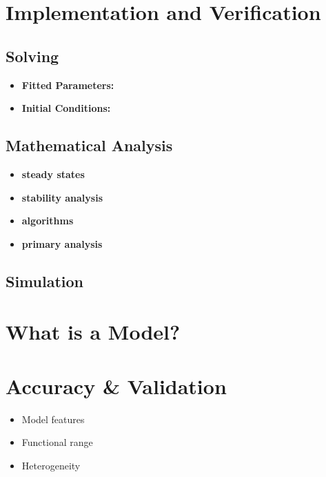 \documentclass[
]{book}
\begin{document}
\section{Implementation and Verification}\label{implementation-and-verification}

\subsection{Solving}\label{solving}

\begin{itemize}
\item
  \textbf{Fitted Parameters:}
\item
  \textbf{Initial Conditions:}
\end{itemize}

\subsection{Mathematical Analysis}\label{mathematical-analysis}

\begin{itemize}
\item
  \textbf{steady states}
\item
  \textbf{stability analysis}
\item
  \textbf{algorithms}
\item
  \textbf{primary analysis}
\end{itemize}

\subsection{Simulation}\label{simulation-1}

\section{What is a Model?}\label{what-is-a-model-1}

\section{Accuracy \& Validation}\label{accuracy-validation}

\begin{itemize}
\item
  Model features
\item
  Functional range
\item
  Heterogeneity
\end{itemize}
\end{document}
